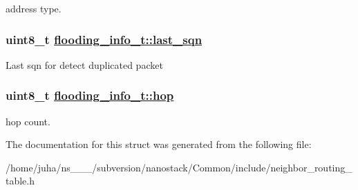 address type. \hypertarget{structflooding__info__t_6718f265896281cd2d48b337197dfbee}{
\subsubsection[last\_\-sqn]{\setlength{\rightskip}{0pt plus 5cm}uint8\_\-t \hyperlink{structflooding__info__t_6718f265896281cd2d48b337197dfbee}{flooding\_\-info\_\-t::last\_\-sqn}}}
\label{structflooding__info__t_6718f265896281cd2d48b337197dfbee}


Last sqn for detect duplicated packet \hypertarget{structflooding__info__t_ea7764e5ced0875f8ebc542021c616e3}{
\subsubsection[hop]{\setlength{\rightskip}{0pt plus 5cm}uint8\_\-t \hyperlink{structflooding__info__t_ea7764e5ced0875f8ebc542021c616e3}{flooding\_\-info\_\-t::hop}}}
\label{structflooding__info__t_ea7764e5ced0875f8ebc542021c616e3}


hop count. 

The documentation for this struct was generated from the following file:\begin{CompactItemize}
\item 
/home/juha/ns\_\_\_/subversion/nanostack/Common/include/neighbor\_\-routing\_\-table.h\end{CompactItemize}
